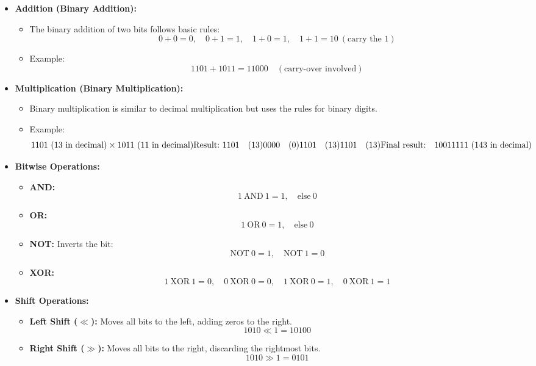 \documentclass[12pt,a4paper]{article}
\begin{document}
\begin{itemize}
    \item \textbf{Addition (Binary Addition):}
    \begin{itemize}
        \item The binary addition of two bits follows basic rules:
        \[
        0 + 0 = 0, \quad 0 + 1 = 1, \quad 1 + 0 = 1, \quad 1 + 1 = 10 \ (\text{carry the 1})
        \]
        \item Example:
        \[
        1101 + 1011 = 11000 \quad (\text{carry-over involved})
        \]
    \end{itemize}
    
    \item \textbf{Multiplication (Binary Multiplication):}
    \begin{itemize}
        \item Binary multiplication is similar to decimal multiplication but uses the rules for binary digits.
        \item Example:
        \[
        1101 \ (\text{13 in decimal}) \\
        \times 1011 \ (\text{11 in decimal}) \\
        \text{Result:} \\
        \ 1101 \quad (13) \\
        0000  \quad (0) \\
        1101  \quad (13) \\
        1101  \quad (13) \\
        \text{Final result:} \quad 10011111 \ (\text{143 in decimal})
        \]
    \end{itemize}
    
    \item \textbf{Bitwise Operations:}
    \begin{itemize}
        \item \textbf{AND:} 
        \[
        1 \ \text{AND} \ 1 = 1, \quad \text{else} \ 0
        \]
        \item \textbf{OR:} 
        \[
        1 \ \text{OR} \ 0 = 1, \quad \text{else} \ 0
        \]
        \item \textbf{NOT:} Inverts the bit: 
        \[
        \text{NOT} \ 0 = 1, \quad \text{NOT} \ 1 = 0
        \]
        \item \textbf{XOR:} 
        \[
        1 \ \text{XOR} \ 1 = 0, \quad 0 \ \text{XOR} \ 0 = 0, \quad 1 \ \text{XOR} \ 0 = 1, \quad 0 \ \text{XOR} \ 1 = 1
        \]
    \end{itemize}

    \item \textbf{Shift Operations:}
    \begin{itemize}
        \item \textbf{Left Shift ($\ll$):} Moves all bits to the left, adding zeros to the right.
        \[
        1010 \ll 1 = 10100
        \]
        \item \textbf{Right Shift ($\gg$):} Moves all bits to the right, discarding the rightmost bits.
        \[
        1010 \gg 1 = 0101
        \]
    \end{itemize}
\end{itemize}
\end{document}
